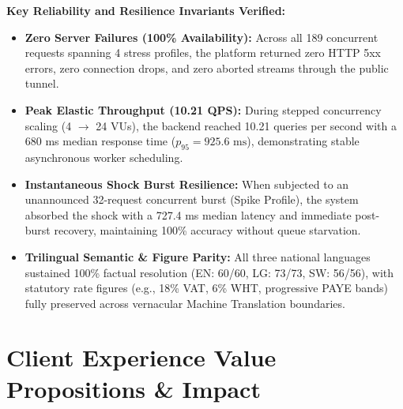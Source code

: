 \documentclass[10pt,a4paper]{article}
\begin{document}
\textbf{Key Reliability and Resilience Invariants Verified:}
\begin{itemize}[leftmargin=5mm,itemsep=1pt]
  \item \textbf{Zero Server Failures (100\% Availability):} Across all 189 concurrent requests spanning 4 stress profiles, the platform returned zero HTTP 5xx errors, zero connection drops, and zero aborted streams through the public tunnel.
  \item \textbf{Peak Elastic Throughput (10.21 QPS):} During stepped concurrency scaling (4 $\rightarrow$ 24 VUs), the backend reached 10.21 queries per second with a 680 ms median response time ($p_{95} = 925.6\text{ ms}$), demonstrating stable asynchronous worker scheduling.
  \item \textbf{Instantaneous Shock Burst Resilience:} When subjected to an unannounced 32-request concurrent burst (Spike Profile), the system absorbed the shock with a 727.4 ms median latency and immediate post-burst recovery, maintaining 100\% accuracy without queue starvation.
  \item \textbf{Trilingual Semantic \& Figure Parity:} All three national languages sustained 100\% factual resolution (EN: 60/60, LG: 73/73, SW: 56/56), with statutory rate figures (e.g., 18\% VAT, 6\% WHT, progressive PAYE bands) fully preserved across vernacular Machine Translation boundaries.
\end{itemize}

\section{Client Experience Value Propositions \& Impact}
\end{document}
